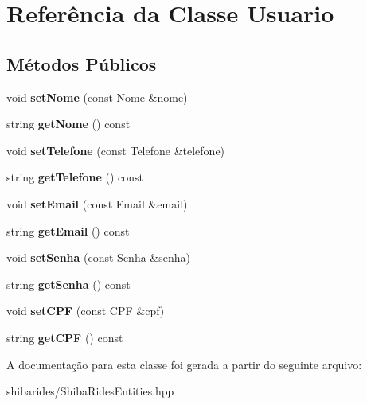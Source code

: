 \hypertarget{classUsuario}{}\section{Referência da Classe Usuario}
\label{classUsuario}
\subsection*{Métodos Públicos}
\begin{DoxyCompactItemize}
\item 
void {\bfseries set\+Nome} (const Nome \&nome)\hypertarget{classUsuario_a006307ffca27e3c9b9587a0fb2c0ee5a}{}\label{classUsuario_a006307ffca27e3c9b9587a0fb2c0ee5a}

\item 
string {\bfseries get\+Nome} () const \hypertarget{classUsuario_ae4339a13b491cdbf1966f68e78721fa1}{}\label{classUsuario_ae4339a13b491cdbf1966f68e78721fa1}

\item 
void {\bfseries set\+Telefone} (const Telefone \&telefone)\hypertarget{classUsuario_ae6fd80c4dc99ef99fce7a22f1b7bd119}{}\label{classUsuario_ae6fd80c4dc99ef99fce7a22f1b7bd119}

\item 
string {\bfseries get\+Telefone} () const \hypertarget{classUsuario_abf90df8371d36c823de3f71a7308e717}{}\label{classUsuario_abf90df8371d36c823de3f71a7308e717}

\item 
void {\bfseries set\+Email} (const Email \&email)\hypertarget{classUsuario_aa52706ef18bfa39a16b0909ccd2becf8}{}\label{classUsuario_aa52706ef18bfa39a16b0909ccd2becf8}

\item 
string {\bfseries get\+Email} () const \hypertarget{classUsuario_a952ed91e8b8dbb020c93c1ae6742e081}{}\label{classUsuario_a952ed91e8b8dbb020c93c1ae6742e081}

\item 
void {\bfseries set\+Senha} (const Senha \&senha)\hypertarget{classUsuario_a126a54fc422205571c6db490dcb9ca03}{}\label{classUsuario_a126a54fc422205571c6db490dcb9ca03}

\item 
string {\bfseries get\+Senha} () const \hypertarget{classUsuario_ac00d912095d97b19cfaf631defb3411b}{}\label{classUsuario_ac00d912095d97b19cfaf631defb3411b}

\item 
void {\bfseries set\+C\+PF} (const C\+PF \&cpf)\hypertarget{classUsuario_aef82401409148e718865f4290f8b35c5}{}\label{classUsuario_aef82401409148e718865f4290f8b35c5}

\item 
string {\bfseries get\+C\+PF} () const \hypertarget{classUsuario_a05a59dd7faa597d322ce1ad8271a4711}{}\label{classUsuario_a05a59dd7faa597d322ce1ad8271a4711}

\end{DoxyCompactItemize}


A documentação para esta classe foi gerada a partir do seguinte arquivo\+:\begin{DoxyCompactItemize}
\item 
shibarides/Shiba\+Rides\+Entities.\+hpp\end{DoxyCompactItemize}
